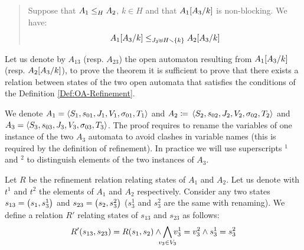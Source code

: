 \documentclass[runningheads]{llncs}
\begin{document}
\begin{quote}
Suppose that $\wrel{A_1}{A_2}{H}$, \(k \in H\) and that \(A_1\subst{A_3}{k}\) is non-blocking.
We have: \[\wrel{A_1\subst{A_3}{k}}{A_2\subst{A_3}{k}}{J_3 \uplus H \setminus \mbrc{k}}\]
\end{quote}


\proof
Let us denote by $A_{13}$ (resp. $A_{23}$) the open automaton resulting from $A_1\subst{A_3}{k}$ (resp. $A_2\subst{A_3}{k}$),  to prove the theorem it is sufficient to prove that there exists a relation between states of the two open automata that satisfies the conditions of the Definition \ref{Def:OA-Refinement}. 

We denote $A_1=  \OA{S_1}{s_{01}}{J_1}{V_1}{\sigma_{01}}{T_1}$ and \(A_2 \defobject \OA{S_2}{s_{02}}{J_2}{V_2}{\sigma_{02}}{T_2}\) and $A_3 = \OA{S_3}{s_{03}}{J_3}{V_3}{\sigma_{03}}{T_3}$. The proof requires  to rename the variables of one instance of the two $A_3$ automata to avoid clashes in variable names (this is required by the definition of refinement). In practice we will use superscripts ${}^1$ and ${}^2$ to distinguish elements of the two instances of $A_3$.

Let $R$ be the refinement relation relating states of $A_1$ and $A_2$. 
Let us denote with $t^1$ and $t^2$  the elements of $A_1$ and $A_2$ respectively.
Consider any two states $s_{13} = \mpar{s_1,s^1_3}$ and $s_{23} = \mpar{s_2,s^2_3}$ ($s^1_3$ and $s^2_3$  are the same with renaming). We define a relation $R'$ relating states of $s_{13}$ and $s_{23}$ as follows:
\[ R' \mpar{s_{13}, s_{23}} = R\mpar{s_{1}, s_{2}}  %
 \wedge \bigwedge_\subbox{v_3\in V_3}
 v^1_3=v^2_3\wedge s^1_3 = s^2_3\]

\end{document}
